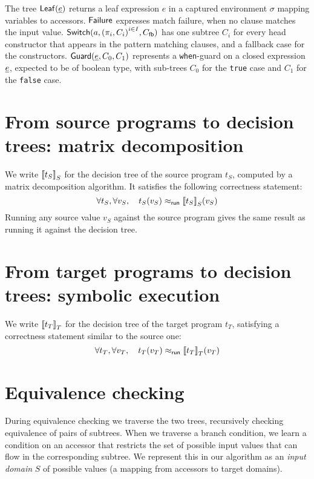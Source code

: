 \documentclass[12pt]{article}
\begin{document}
The tree $\Leaf \cle$ returns a leaf expression $e$ in a captured
environment $\sigma$ mapping variables to accessors.
%
$\Failure$ expresses match failure, when no clause matches the input
value.
%
$\Switch a {\Fam {i \in I} {\pi_i, C_i}} \Cfb$ has one subtree $C_i$
for every head constructor that appears in the pattern matching
clauses, and a fallback case for the constructors.
%
$\Guard \cle {C_0} {C_1}$ represents a \texttt{when}-guard on a closed
expression $\cle$, expected to be of boolean type, with sub-trees
$C_0$ for the \texttt{true} case and $C_1$ for the \texttt{false}
case.

\section{From source programs to decision trees: matrix decomposition}

We write $\sem{t_S}_S$ for the decision tree of the source program
$t_S$, computed by a matrix decomposition algorithm.
It satisfies the following correctness statement:
\[
\forall t_S, \forall v_S, \quad \runrel {t_S(v_S)} {\sem{t_S}_S(v_S)}
\]
Running any source value $v_S$ against the source program gives the
same result as running it against the decision tree.


\section{From target programs to decision trees: symbolic execution}

We write $\sem{t_T}_T$ for the decision tree of the target program
$t_T$, satisfying a correctness statement similar to the source one:
\[
\forall t_T, \forall v_T, \quad \runrel {t_T(v_T)} {\sem{t_T}_T(v_T)}
\]

\section{Equivalence checking}

During equivalence checking we traverse the two trees, recursively checking equivalence of pairs of subtrees.
When we traverse a branch condition, we learn a condition
on an accessor that restricts the set of possible input values that can flow in the corresponding subtree.
We represent this in our algorithm as an \emph{input domain} $S$ of possible values (a mapping from accessors to target domains).
\end{document}

